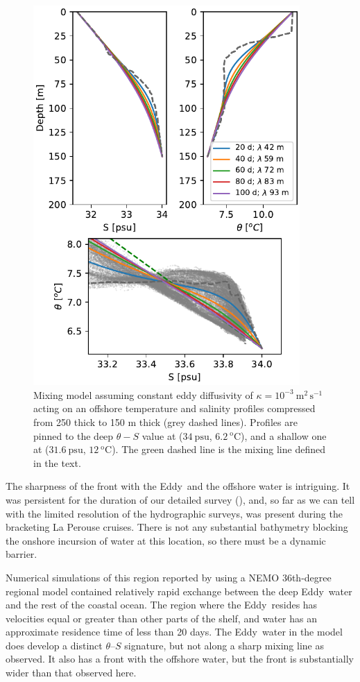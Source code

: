 \documentclass[draft]{agujournal2019}
\newcommand*{\Eddy}{{\sc Eddy}}
\begin{document}
\begin{figure}[htbp]
  \begin{center}
    \includegraphics[width=4in]{TSExercise}
    \caption{Mixing model assuming constant eddy diffusivity of $\kappa = 10^{-3}\ \mathrm{m^2\,s^{-1}}$ acting on an offshore temperature and salinity profiles compressed from 250 thick to 150 m thick (grey dashed lines).  Profiles are pinned to the deep $\theta-S$ value at ($34\ \mathrm{psu}$, $6.2\ \mathrm{^oC}$), and a shallow one at ($31.6\ \mathrm{psu}$, $12\ \mathrm{^oC}$).  The green dashed line is the mixing line defined in the text.
      \label{fig:TSExercise} }
  \end{center}
\end{figure}

The sharpness of the front with the \Eddy\ and the offshore water is intriguing.  It was persistent for the duration of our detailed survey (), and, so far as we can tell with the limited resolution of the hydrographic surveys, was present during the bracketing La Perouse cruises. There is not any substantial bathymetry blocking the onshore incursion of water at this location, so there must be a dynamic barrier.

Numerical simulations of this region reported by \cite{sahuetal22} using a NEMO 36th-degree regional model contained relatively rapid exchange between the deep \Eddy\ water and the rest of the coastal ocean.  The region where the \Eddy\ resides has velocities equal or greater than other parts of the shelf, and water has an approximate residence time of less than 20 days.  The \Eddy\ water in the model does develop a distinct $\theta$--$S$ signature, but not along a sharp mixing line as observed.  It also has a front with the offshore water, but the front is substantially wider than that observed here.
\end{document}
